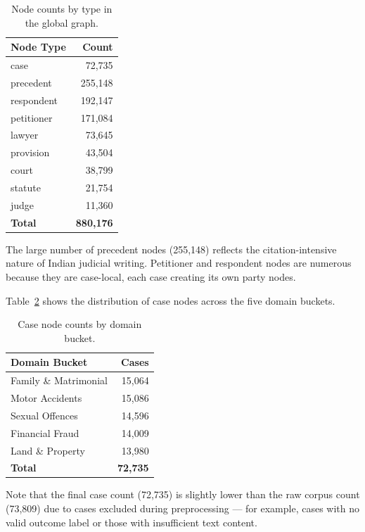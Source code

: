 \begin{table}[H]
\centering
\caption{Node counts by type in the global graph.}
\label{tab:node-type-counts}
\begin{tabular}{@{}lr@{}}
\toprule
\textbf{Node Type} & \textbf{Count} \\
\midrule
case          & 72,735 \\
precedent     & 255,148 \\
respondent    & 192,147 \\
petitioner    & 171,084 \\
lawyer        & 73,645 \\
provision     & 43,504 \\
court         & 38,799 \\
statute       & 21,754 \\
judge         & 11,360 \\
\midrule
\textbf{Total} & \textbf{880,176} \\
\bottomrule
\end{tabular}
\end{table}

The large number of precedent nodes (255,148) reflects the citation-intensive nature of Indian judicial writing. Petitioner and respondent nodes are numerous because they are case-local, each case creating its own party nodes.

Table~\ref{tab:bucket-case-counts} shows the distribution of case nodes across the five domain buckets.

\begin{table}[H]
\centering
\caption{Case node counts by domain bucket.}
\label{tab:bucket-case-counts}
\begin{tabular}{@{}lr@{}}
\toprule
\textbf{Domain Bucket} & \textbf{Cases} \\
\midrule
Family \& Matrimonial  & 15,064 \\
Motor Accidents        & 15,086 \\
Sexual Offences        & 14,596 \\
Financial Fraud        & 14,009 \\
Land \& Property       & 13,980 \\
\midrule
\textbf{Total}         & \textbf{72,735} \\
\bottomrule
\end{tabular}
\end{table}

Note that the final case count (72,735) is slightly lower than the raw corpus count (73,809) due to cases excluded during preprocessing — for example, cases with no valid outcome label or those with insufficient text content.

